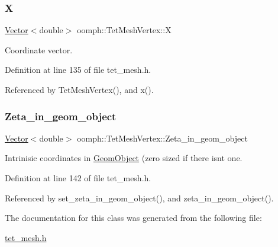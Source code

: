 \mbox{\label{classoomph_1_1TetMeshVertex_a32a797224c3506b9594b657e1032e7d9}} 
\subsubsection{\texorpdfstring{X}{X}}
{\footnotesize\ttfamily \hyperlink{classoomph_1_1Vector}{Vector}$<$double$>$ oomph\+::\+Tet\+Mesh\+Vertex\+::X\hspace{0.3cm}{\ttfamily [private]}}



Coordinate vector. 



Definition at line 135 of file tet\+\_\+mesh.\+h.



Referenced by Tet\+Mesh\+Vertex(), and x().

\mbox{\label{classoomph_1_1TetMeshVertex_a945dd663092098554d394e2b50ef9ef2}} 
\subsubsection{\texorpdfstring{Zeta\+\_\+in\+\_\+geom\+\_\+object}{Zeta\_in\_geom\_object}}
{\footnotesize\ttfamily \hyperlink{classoomph_1_1Vector}{Vector}$<$double$>$ oomph\+::\+Tet\+Mesh\+Vertex\+::\+Zeta\+\_\+in\+\_\+geom\+\_\+object\hspace{0.3cm}{\ttfamily [private]}}



Intrinisic coordinates in \hyperlink{classoomph_1_1GeomObject}{Geom\+Object} (zero sized if there isn\textquotesingle{}t one. 



Definition at line 142 of file tet\+\_\+mesh.\+h.



Referenced by set\+\_\+zeta\+\_\+in\+\_\+geom\+\_\+object(), and zeta\+\_\+in\+\_\+geom\+\_\+object().



The documentation for this class was generated from the following file\+:\begin{DoxyCompactItemize}
\item 
\hyperlink{tet__mesh_8h}{tet\+\_\+mesh.\+h}\end{DoxyCompactItemize}
